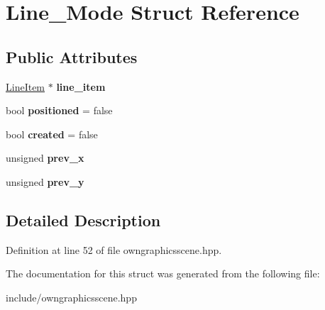 \hypertarget{structLine__Mode}{}\section{Line\+\_\+\+Mode Struct Reference}
\label{structLine__Mode}
\subsection*{Public Attributes}
\begin{DoxyCompactItemize}
\item 
\mbox{\label{structLine__Mode_a4e11b31f28505579f3dfcde54b27ecac}} 
\mbox{\hyperlink{classLineItem}{Line\+Item}} $\ast$ {\bfseries line\+\_\+item}
\item 
\mbox{\label{structLine__Mode_aefbb8555f406d47d742491003a6afde1}} 
bool {\bfseries positioned} = false
\item 
\mbox{\label{structLine__Mode_ae48257668288a2a284bef66727fa68e5}} 
bool {\bfseries created} = false
\item 
\mbox{\label{structLine__Mode_a8bbcbaff29a7810e066e99174e562371}} 
unsigned {\bfseries prev\+\_\+x}
\item 
\mbox{\label{structLine__Mode_a8d5fb940f686955ead3f368a8d3b9016}} 
unsigned {\bfseries prev\+\_\+y}
\end{DoxyCompactItemize}


\subsection{Detailed Description}


Definition at line 52 of file owngraphicsscene.\+hpp.



The documentation for this struct was generated from the following file\+:\begin{DoxyCompactItemize}
\item 
include/owngraphicsscene.\+hpp\end{DoxyCompactItemize}
